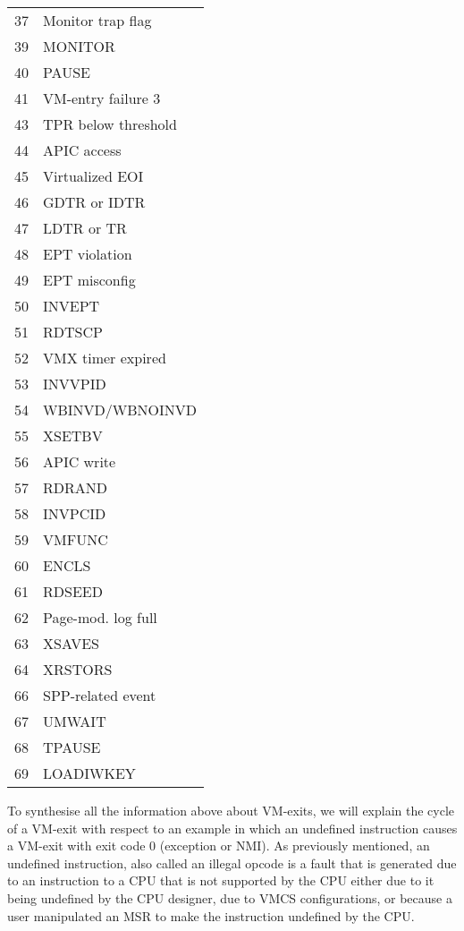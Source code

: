 \documentclass{report}
\begin{document}
\begin{spacing}{1.5}
\begin{longtable}{|c|l|}
\large{37} & \large{Monitor trap flag} \\
\large{39} & \large{MONITOR} \\
\large{40} & \large{PAUSE} \\
\large{41} & \large{VM-entry failure 3} \\
\large{43} & \large{TPR below threshold} \\
\large{44} & \large{APIC access} \\
\large{45} & \large{Virtualized EOI} \\
\large{46} & \large{GDTR or IDTR} \\
\large{47} & \large{LDTR or TR} \\
\large{48} & \large{EPT violation} \\
\large{49} & \large{EPT misconfig} \\
\large{50} & \large{INVEPT} \\
\large{51} & \large{RDTSCP} \\
\large{52} & \large{VMX timer expired} \\
\large{53} & \large{INVVPID} \\
\large{54} & \large{WBINVD/WBNOINVD} \\
\large{55} & \large{XSETBV} \\
\large{56} & \large{APIC write} \\
\large{57} & \large{RDRAND} \\
\large{58} & \large{INVPCID} \\
\large{59} & \large{VMFUNC} \\
\large{60} & \large{ENCLS} \\
\large{61} & \large{RDSEED} \\
\large{62} & \large{Page-mod. log full} \\
\large{63} & \large{XSAVES} \\
\large{64} & \large{XRSTORS} \\
\large{66} & \large{SPP-related event} \\
\large{67} & \large{UMWAIT} \\
\large{68} & \large{TPAUSE} \\
\large{69} & \large{LOADIWKEY} \\
\end{longtable}
\leavevmode\newline



{\large
\noindent To synthesise all the information above about VM-exits, we will explain the cycle of a VM-exit with respect to an example in which an undefined instruction causes a VM-exit with exit code 0 (exception or NMI). As previously mentioned, an undefined instruction, also called an illegal opcode is a fault that is generated due to an instruction to a CPU that is not supported by the CPU either due to it being undefined by the CPU designer, due to VMCS configurations, or because a user manipulated an MSR to make the instruction undefined by the CPU.
\newline
}



\end{spacing}
\end{document}
